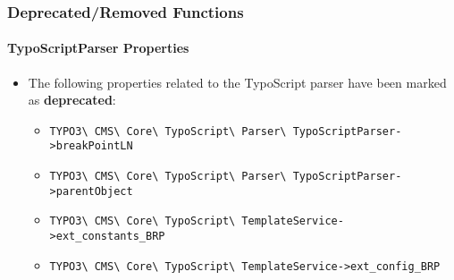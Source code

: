 %

\begin{frame}[fragile]
	\frametitle{Deprecated/Removed Functions}
	\framesubtitle{TypoScriptParser Properties}

	\begin{itemize}
		\item The following properties related to the TypoScript parser have
			been marked as \textbf{deprecated}:
			\vspace{0.2cm}
			\begin{itemize}\smaller
				\item \texttt{TYPO3\textbackslash
					CMS\textbackslash
					Core\textbackslash
					TypoScript\textbackslash
					Parser\textbackslash
					TypoScriptParser->breakPointLN}
				\item \texttt{TYPO3\textbackslash
					CMS\textbackslash
					Core\textbackslash
					TypoScript\textbackslash
					Parser\textbackslash
					TypoScriptParser->parentObject}
				\item \texttt{TYPO3\textbackslash
					CMS\textbackslash
					Core\textbackslash
					TypoScript\textbackslash
					TemplateService->ext\_constants\_BRP}
				\item \texttt{TYPO3\textbackslash
					CMS\textbackslash
					Core\textbackslash
					TypoScript\textbackslash
					TemplateService->ext\_config\_BRP}
			\end{itemize}

	\end{itemize}

\end{frame}

